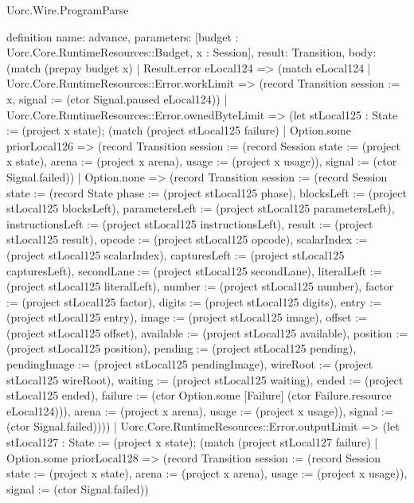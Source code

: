 \begin{lexlean}{Uorc.Wire.ProgramParse}
\begin{semanticmodule}
definition{
  name: advance,
  parameters: [budget : Uorc.Core.RuntimeResources::Budget, x : Session],
  result: Transition,
  body: (match (prepay budget x)
    | Result.error eLocal124 => (match eLocal124
      | Uorc.Core.RuntimeResources::Error.workLimit => (record Transition {session := x, signal := (ctor Signal.paused eLocal124)})
      | Uorc.Core.RuntimeResources::Error.ownedByteLimit => (let stLocal125 : State := (project x state); (match (project stLocal125 failure)
        | Option.some priorLocal126 => (record Transition {session := (record Session {state := (project x state), arena := (project x arena), usage := (project x usage)}), signal := (ctor Signal.failed)})
        | Option.none => (record Transition {session := (record Session {state := (record State {phase := (project stLocal125 phase), blocksLeft := (project stLocal125 blocksLeft), parametersLeft := (project stLocal125 parametersLeft), instructionsLeft := (project stLocal125 instructionsLeft), result := (project stLocal125 result), opcode := (project stLocal125 opcode), scalarIndex := (project stLocal125 scalarIndex), capturesLeft := (project stLocal125 capturesLeft), secondLane := (project stLocal125 secondLane), literalLeft := (project stLocal125 literalLeft), number := (project stLocal125 number), factor := (project stLocal125 factor), digits := (project stLocal125 digits), entry := (project stLocal125 entry), image := (project stLocal125 image), offset := (project stLocal125 offset), available := (project stLocal125 available), position := (project stLocal125 position), pending := (project stLocal125 pending), pendingImage := (project stLocal125 pendingImage), wireRoot := (project stLocal125 wireRoot), waiting := (project stLocal125 waiting), ended := (project stLocal125 ended), failure := (ctor Option.some [Failure] (ctor Failure.resource eLocal124))}), arena := (project x arena), usage := (project x usage)}), signal := (ctor Signal.failed)})))
      | Uorc.Core.RuntimeResources::Error.outputLimit => (let stLocal127 : State := (project x state); (match (project stLocal127 failure)
        | Option.some priorLocal128 => (record Transition {session := (record Session {state := (project x state), arena := (project x arena), usage := (project x usage)}), signal := (ctor Signal.failed)})
}
\end{semanticmodule}
\end{lexlean}
